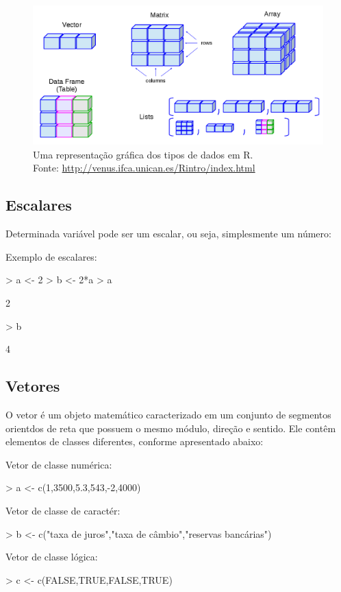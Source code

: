 \documentclass[12pt,a4paper,oneside]{erdc}
\begin{document}
\begin{figure}
	\centering
	\includegraphics[width=\linewidth]{../figs/BP_Curso_TecComp_00_2019_f02-04}
	\caption{Uma representação gráfica dos tipos de dados em R. \\ Fonte: \url{http://venus.ifca.unican.es/Rintro/index.html}}
	\label{fig:f02-04}
\end{figure}



\subsection{Escalares}
Determinada variável pode ser um escalar, ou seja, simplesmente um número:

Exemplo de escalares:
\begin{Schunk}
\begin{Sinput}
> a <- 2
> b <- 2*a
> a
\end{Sinput}
\begin{Soutput}
[1] 2
\end{Soutput}
\begin{Sinput}
> b
\end{Sinput}
\begin{Soutput}
[1] 4
\end{Soutput}
\end{Schunk}

\subsection{Vetores}
O vetor é um objeto matemático caracterizado em um conjunto de segmentos orientdos de reta que possuem o mesmo módulo, direção e sentido. Ele contêm elementos de classes diferentes, conforme apresentado abaixo:


Vetor de classe numérica:
\begin{Schunk}
\begin{Sinput}
> a <- c(1,3500,5.3,543,-2,4000)
\end{Sinput}
\end{Schunk}
Vetor de classe de caractér:
\begin{Schunk}
\begin{Sinput}
> b <- c("taxa de juros","taxa de câmbio","reservas bancárias") 
\end{Sinput}
\end{Schunk}
Vetor de classe lógica:
\begin{Schunk}
\begin{Sinput}
> c <- c(FALSE,TRUE,FALSE,TRUE) 
\end{Sinput}
\end{Schunk}
\end{document}
